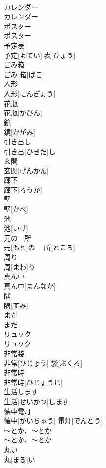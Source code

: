\documentclass[8pt]{extreport}
\begin{document}
\begin{CJK}{UTF8}{min}
\\	カレンダー	
\\	カレンダー	
\\	ポスター	
\\	ポスター	
\\	予定表	
\\	予定[よてい] 表[ひょう]	
\\	ごみ箱	
\\	ごみ 箱[ばこ]	
\\	人形	
\\	人形[にんぎょう]	
\\	花瓶	
\\	花瓶[かびん]	
\\	鏡	
\\	鏡[かがみ]	
\\	引き出し	
\\	引き出[ひきだ]し	
\\	玄関	
\\	玄関[げんかん]	
\\	廊下	
\\	廊下[ろうか]	
\\	壁	
\\	壁[かべ]	
\\	池	
\\	池[いけ]	
\\	元の　所	
\\	元[もと]の　 所[ところ]	
\\	周り	
\\	周[まわ]り	
\\	真ん中	
\\	真ん中[まんなか]	
\\	隅	
\\	隅[すみ]	
\\	まだ	
\\	まだ	
\\	リュック	
\\	リュック	
\\	非常袋	
\\	非常[ひじょう] 袋[ぶくろ]	
\\	非常時	
\\	非常時[ひじょうじ]	
\\	生活します	
\\	生活[せいかつ]します	
\\	懐中電灯	
\\	懐中[かいちゅう] 電灯[でんとう]	
\\	〜とか、〜とか	
\\	〜とか、〜とか	
\\	丸い	
\\	丸[まる]い	

\end{CJK}
\end{document}
